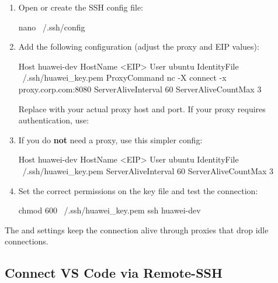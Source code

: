\documentclass[english]{guide}
\begin{document}
\passoapasso
\begin{enumerate}
  \item Open or create the SSH config file:

  \begin{codigo}[bash]
nano ~/.ssh/config
  \end{codigo}

  \item Add the following configuration (adjust the proxy and EIP values):

  \begin{codigo}
Host huawei-dev
    HostName <EIP>
    User ubuntu
    IdentityFile ~/.ssh/huawei_key.pem
    ProxyCommand nc -X connect -x proxy.corp.com:8080 %
    ServerAliveInterval 60
    ServerAliveCountMax 3
  \end{codigo}

  \begin{infobox}
  Replace  with your actual proxy host and port.
  If your proxy requires authentication, use:
  \end{infobox}

  \item If you do \textbf{not} need a proxy, use this simpler config:

  \begin{codigo}
Host huawei-dev
    HostName <EIP>
    User ubuntu
    IdentityFile ~/.ssh/huawei_key.pem
    ServerAliveInterval 60
    ServerAliveCountMax 3
  \end{codigo}

  \item Set the correct permissions on the key file and test the connection:

  \begin{codigo}[bash]
chmod 600 ~/.ssh/huawei_key.pem
ssh huawei-dev
  \end{codigo}
\end{enumerate}

\begin{dica}
The  and  settings keep
the connection alive through proxies that drop idle connections.
\end{dica}

\subsection{Connect VS Code via Remote-SSH}
\end{document}
